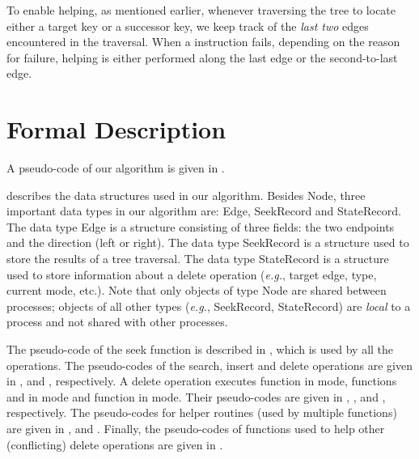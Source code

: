 \begin{limitscope}
To enable helping, as mentioned earlier, whenever traversing the tree to locate either a target key or a successor key, we keep track of the \emph{last two} edges encountered in the traversal. When a \CAS{} instruction fails, depending on the reason for failure, helping is either performed along the last edge or the second-to-last edge. 


\section{Formal Description}
A pseudo-code of our algorithm is given in .

 describes the data structures used in our algorithm. Besides \textsf{Node}, three important data types in our algorithm are: \textsf{Edge}, \textsf{SeekRecord} and \textsf{StateRecord}. The data type \textsf{Edge} is a structure consisting of three fields: the two endpoints and the direction (left or right). The data type \textsf{SeekRecord} is a structure used to store the results of a tree traversal. The data type \textsf{StateRecord} is a structure used to store information about a delete operation (\emph{e.g.}, target edge, type,  current mode, etc.). Note that only objects of type \textsf{Node} are shared between processes; objects of all other types (\emph{e.g.}, \textsf{SeekRecord}, \textsf{StateRecord}) are \emph{local} to a process and not shared with other processes.

The pseudo-code of the seek function is described in , which is used by all the operations. The pseudo-codes of the search, insert and delete operations are given in ,  and , respectively. A delete operation executes  function \Inject{} in \injection{} mode, functions \FindAndMarkSuccessor{} and \RemoveSuccessor{} in \discovery{} mode and function \Cleanup{} in \cleanup{} mode. Their pseudo-codes are given in , ,  and , respectively. The pseudo-codes for helper routines (used by multiple functions) are given in ,  and . Finally, the pseudo-codes of functions used to help other (conflicting) delete operations are given in .


\end{limitscope}